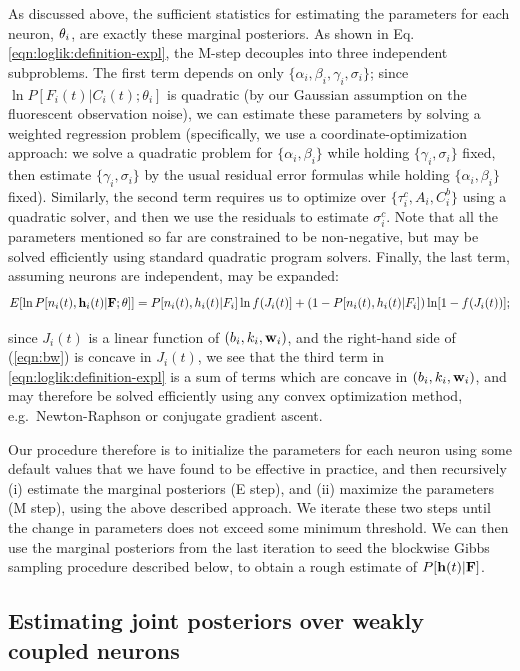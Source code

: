 As discussed above, the sufficient statistics for estimating the
parameters for each neuron, $\mathbf{\theta}_i$, are exactly these marginal
posteriors.  As shown in Eq. \ref{eqn:loglik:definition-expl}, the
M-step decouples into three independent subproblems.  The first term
depends on only $\{\alpha_i, \beta_i, \gamma_i, \sigma_i\}$; since
$\ln P[F_i(t)|C_i(t); \theta_i]$ is quadratic (by our Gaussian
assumption on the fluorescent observation noise), we can estimate
these parameters by solving a weighted regression problem
(specifically, we use a coordinate-optimization approach: we solve a
quadratic problem for $\{\alpha_i, \beta_i\}$ while holding
$\{\gamma_i, \sigma_i\}$ fixed, then estimate $\{\gamma_i,\sigma_i\}$
by the usual residual error formulas while holding $\{\alpha_i,
\beta_i\}$ fixed).  Similarly, the second term requires us to optimize
over $\{\tau_i^c, A_i, C_i^b\}$ using a quadratic solver, and then we
use the residuals to estimate $\sigma_i^c$.  Note that all the
parameters mentioned so far are constrained to be non-negative, but
may be solved efficiently using standard quadratic program solvers.
Finally, the last term, assuming neurons are independent, may be
expanded:
\begin{equation} 
  E [\ln P[n_i(t), \bh_i(t) | \bF; \bth]] = P[n_i(t), h_i(t) | F_i]
\ln f (J_i(t)] + (1-P[n_i(t), h_i(t) | F_i]) \ln [1- f(J_i(t))];
\label{eqn:bw}
\end{equation}

since $J_i(t)$ is a linear function of $(b_i,k_i,\mathbf{w}_i)$, and the
right-hand side of (\ref{eqn:bw}) is concave in $J_i(t)$, we see that
the third term in \ref{eqn:loglik:definition-expl} is a sum of terms
which are concave in $(b_i,k_i,\mathbf{w}_i)$, and may therefore be solved
efficiently using any convex optimization method, e.g.\ Newton-Raphson
or conjugate gradient ascent.

Our procedure therefore is to initialize the parameters for each
neuron using some default values that we have found to be effective in
practice, and then recursively (i) estimate the marginal posteriors (E
step), and (ii) maximize the parameters (M step), using the above
described approach.  We iterate these two steps until the change in
parameters does not exceed some minimum threshold.  We can then use
the marginal posteriors from the last iteration to seed the blockwise
Gibbs sampling procedure described below, to obtain a rough estimate
of $P[\mathbf{h}(t) | {\bf F}]$.

\subsection{Estimating joint posteriors over weakly coupled neurons}
\label{sec:methods:joint}

